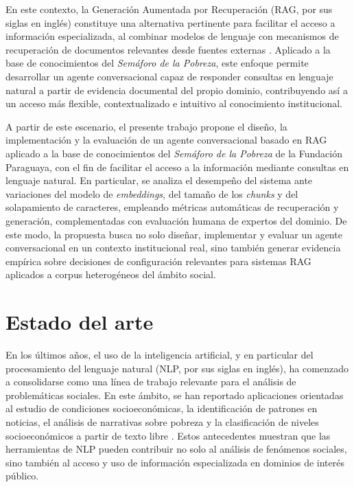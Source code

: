 \documentclass{article}
\begin{document}
En este contexto, la Generación Aumentada por Recuperación (RAG, por sus siglas en inglés) constituye una alternativa pertinente para facilitar el acceso a información especializada, al combinar modelos de lenguaje con mecanismos de recuperación de documentos relevantes desde fuentes externas \cite{Lewis2020RAG}. Aplicado a la base de conocimientos del \textit{Semáforo de la Pobreza}, este enfoque permite desarrollar un agente conversacional capaz de responder consultas en lenguaje natural a partir de evidencia documental del propio dominio, contribuyendo así a un acceso más flexible, contextualizado e intuitivo al conocimiento institucional.

A partir de este escenario, el presente trabajo propone el diseño, la implementación y la evaluación de un agente conversacional basado en RAG aplicado a la base de conocimientos del \textit{Semáforo de la Pobreza} de la Fundación Paraguaya, con el fin de facilitar el acceso a la información mediante consultas en lenguaje natural. En particular, se analiza el desempeño del sistema ante variaciones del modelo de \textit{embeddings}, del tamaño de los \textit{chunks} y del solapamiento de caracteres, empleando métricas automáticas de recuperación y generación, complementadas con evaluación humana de expertos del dominio. De este modo, la propuesta busca no solo diseñar, implementar y evaluar un agente conversacional en un contexto institucional real, sino también generar evidencia empírica sobre decisiones de configuración relevantes para sistemas RAG aplicados a corpus heterogéneos del ámbito social.
\section{Estado del arte}\label{sec:estadoArte}

En los últimos años, el uso de la inteligencia artificial, y en particular del procesamiento del lenguaje natural (NLP, por sus siglas en inglés), ha comenzado a consolidarse como una línea de trabajo relevante para el análisis de problemáticas sociales. En este ámbito, se han reportado aplicaciones orientadas al estudio de condiciones socioeconómicas, la identificación de patrones en noticias, el análisis de narrativas sobre pobreza y la clasificación de niveles socioeconómicos a partir de texto libre \cite{nlp_social_good_survey}. Estos antecedentes muestran que las herramientas de NLP pueden contribuir no solo al análisis de fenómenos sociales, sino también al acceso y uso de información especializada en dominios de interés público.
\end{document}

